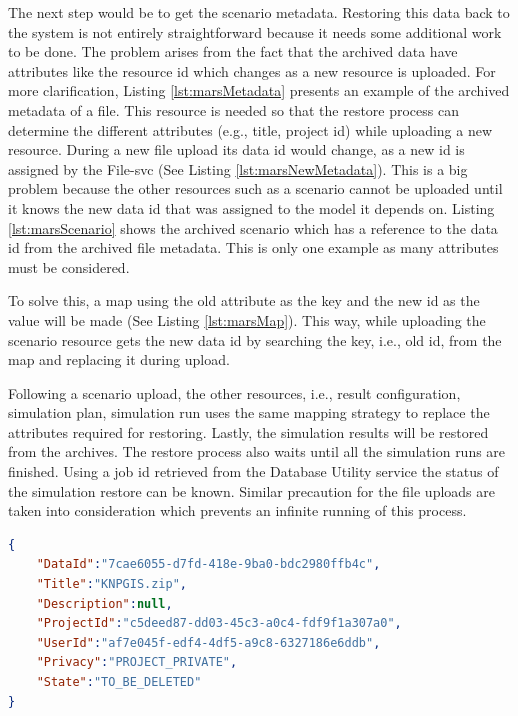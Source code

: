 The next step would be to get the scenario metadata. Restoring this data back to the system is not entirely straightforward because it needs some additional 
work to be done. 
The problem arises from the fact that the archived data have attributes like the resource id which changes as a new resource is uploaded. For more clarification, 
Listing \ref{lst:marsMetadata} presents an example of the archived metadata of a file. This resource is needed so that the restore process can determine the different 
attributes (e.g., title, project id) while uploading a new resource. During a new file upload 
its data id would change, as a new id is assigned by the File-svc (See Listing \ref{lst:marsNewMetadata}). 
This is a big problem because the other resources such as a scenario cannot be uploaded until it knows the new data id that was assigned to the model it 
depends on. Listing \ref{lst:marsScenario} shows the archived scenario which has a reference to the data id from the archived file metadata. 
This is only one example as many attributes must be considered. 

To solve this, a map using the old attribute as the key and the 
new id as the value will be made (See Listing \ref{lst:marsMap}).
This way, while uploading the scenario resource gets the new data id by searching the key, i.e., old id, from the map and replacing it during upload. 

Following a scenario upload, the other resources, i.e., result configuration, simulation plan, simulation run uses the same mapping strategy to replace 
the attributes required for restoring. 
Lastly, the simulation results will be restored from the archives. The restore process also waits until all the simulation runs are finished. Using a job id retrieved from the Database 
Utility service the status of the simulation restore can be known. Similar precaution for the file uploads are taken into consideration which prevents an infinite running
of this process.


\newpage
\begin{lstlisting}[caption={Snippet of archived MARS metadata resource}, language=json,firstnumber=1, captionpos=b, label={lst:marsMetadata}]
{
    "DataId":"7cae6055-d7fd-418e-9ba0-bdc2980ffb4c",
    "Title":"KNPGIS.zip",
    "Description":null,
    "ProjectId":"c5deed87-dd03-45c3-a0c4-fdf9f1a307a0",
    "UserId":"af7e045f-edf4-4df5-a9c8-6327186e6ddb",
    "Privacy":"PROJECT_PRIVATE",
    "State":"TO_BE_DELETED"
}
\end{lstlisting}

